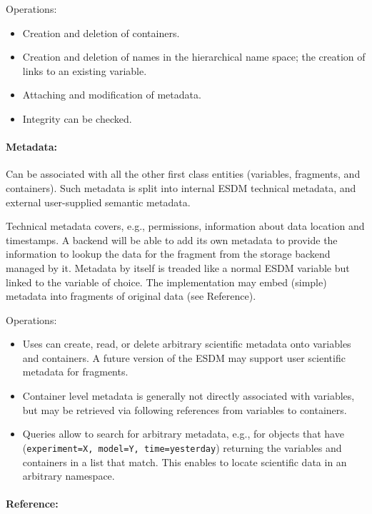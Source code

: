 Operations:

\begin{itemize}
  \item Creation and deletion of containers.
  \item Creation and deletion of names in the hierarchical name space; the creation of links to an existing variable.
  \item Attaching and modification of metadata.
  \item Integrity can be checked.
\end{itemize}

\paragraph{Metadata:}%
\label{metadata-1}

Can be associated with all the other first class entities (variables,
fragments, and containers). Such metadata is split into internal ESDM
technical metadata, and external user-supplied semantic metadata.

Technical metadata covers, e.g., permissions, information about data
location and timestamps. A backend will be able to add its own metadata
to provide the information to lookup the data for the fragment from the
storage backend managed by it. Metadata by itself is treaded like a
normal ESDM variable but linked to the variable of choice. The
implementation may embed (simple) metadata into fragments of original
data (see Reference).

Operations:

\begin{itemize}
  \item Uses can create, read, or delete arbitrary scientific metadata onto
    variables and containers. A future version of the ESDM may support
    user scientific metadata for fragments.
  \item Container level metadata is generally not directly associated with
    variables, but may be retrieved via following references from
    variables to containers.
  \item Queries allow to search for arbitrary metadata, e.g., for objects that
    have (\texttt{experiment=X,\ model=Y,\ time=yesterday}) returning the
    variables and containers in a list that match. This enables to locate
    scientific data in an arbitrary namespace.
\end{itemize}

\paragraph{Reference:}%
\label{reference}

